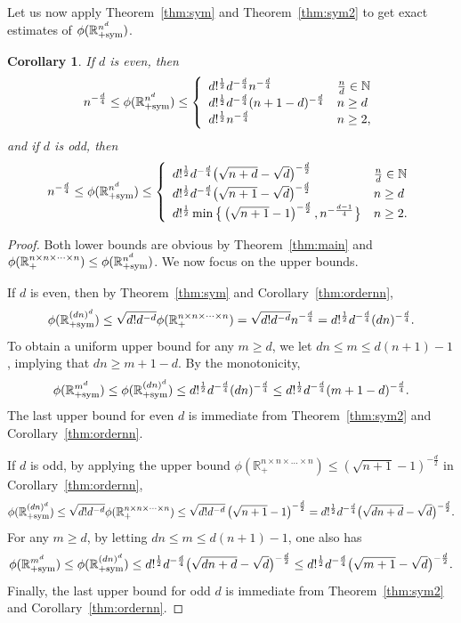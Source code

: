 \documentclass[11pt]{article}
\newtheorem{corollary}[theorem]{Corollary}
\newcommand{\R}{\mathbb{R}}
\newcommand{\N}{\mathbb{N}}
\newcommand{\sym}{\textnormal{sym}}
\begin{document}
Let us now apply Theorem~\ref{thm:sym} and Theorem~\ref{thm:sym2} to get exact estimates of $\phi(\R^{n^d}_{+\sym})$.
\begin{corollary}\label{thm:sym3}
If $d$ is even, then
  $$
  n^{-\frac{d}{4}}\le \phi(\R^{n^d}_{+\sym}) \le \left\{
  \begin{array}{ll}
  d!^{\frac{1}{2}}d^{-\frac{d}{4}}n^{-\frac{d}{4}} & \frac{n}{d}\in\N \\
  d!^{\frac{1}{2}}d^{-\frac{d}{4}}(n+1-d)^{-\frac{d}{4}} & n\ge d \\
  d!^{\frac{1}{2}}n^{-\frac{d}{4}} & n\ge2,
  \end{array}
  \right.
  $$
and if $d$ is odd, then
  $$
  n^{-\frac{d}{4}}\le \phi(\R^{n^d}_{+\sym}) \le \left\{
  \begin{array}{ll}
  d!^{\frac{1}{2}}d^{-\frac{d}{4}} \big{(}\sqrt{n+d}-\sqrt{d}\big{)}^{-\frac{d}{2}} & \frac{n}{d}\in\N \\
  d!^{\frac{1}{2}}d^{-\frac{d}{4}} \big{(}\sqrt{n+1}-\sqrt{d}\big{)}^{-\frac{d}{2}} & n\ge d \\
  d!^{\frac{1}{2}}\min\big{\{}\left(\sqrt{n+1}-1\right)^{-\frac{d}{2}},n^{-\frac{d-1}{4}}\big{\}} & n\ge2.
  \end{array}
  \right.
  $$
\end{corollary}
\begin{proof}
Both lower bounds are obvious by Theorem~\ref{thm:main} and $\phi(\R^{n\times n\times \dots \times n}_+) \le \phi(\R^{n^d}_{+\sym})$. We now focus on the upper bounds.

If $d$ is even, then by Theorem~\ref{thm:sym} and Corollary~\ref{thm:ordernn},
  $$
  \phi(\R^{(dn)^d}_{+\sym}) \le \sqrt{d!d^{-d}}\phi(\R^{n\times n\times \dots \times n}_+) = \sqrt{d!d^{-d}}n^{-\frac{d}{4}} = d!^{\frac{1}{2}}d^{-\frac{d}{4}}(dn)^{-\frac{d}{4}}.
  $$
  To obtain a uniform upper bound for any $m\ge d$, we let $dn\le m\le d(n+1)-1$, implying that $dn\ge m+1-d$. By the monotonicity,
  $$
  \phi(\R^{m^d}_{+\sym})\le \phi(\R^{(dn)^d}_{+\sym})\le d!^{\frac{1}{2}}d^{-\frac{d}{4}}(dn)^{-\frac{d}{4}} \le d!^{\frac{1}{2}}d^{-\frac{d}{4}}(m+1-d)^{-\frac{d}{4}}.
  $$
The last upper bound for even $d$ is immediate from Theorem~\ref{thm:sym2} and Corollary~\ref{thm:ordernn}.

If $d$ is odd, by applying the upper bound $\phi(\R_+^{n\times n\times \dots \times n}) \le \left(\sqrt{n+1}-1\right)^{-\frac{d}{2}}$ in Corollary~\ref{thm:ordernn},
  $$
  \phi(\R^{(dn)^d}_{+\sym}) \le \sqrt{d!d^{-d}}\phi(\R^{n\times n\times \dots \times n}_+) \le \sqrt{d!d^{-d}} \left(\sqrt{n+1}-1\right)^{-\frac{d}{2}} = d!^{\frac{1}{2}}d^{-\frac{d}{4}} \big{(}\sqrt{dn+d}-\sqrt{d}\big{)}^{-\frac{d}{2}}.
  $$
For any $m\ge d$, by letting $dn\le m\le d(n+1)-1$, one also has
  $$
  \phi(\R^{m^d}_{+\sym}) \le \phi(\R^{(dn)^d}_{+\sym}) \le d!^{\frac{1}{2}}d^{-\frac{d}{4}} \big{(}\sqrt{dn+d}-\sqrt{d}\big{)}^{-\frac{d}{2}} \le d!^{\frac{1}{2}}d^{-\frac{d}{4}} \big{(}\sqrt{m+1}-\sqrt{d}\big{)}^{-\frac{d}{2}}.
  $$
  Finally, the last upper bound for odd $d$ is immediate from Theorem~\ref{thm:sym2} and Corollary~\ref{thm:ordernn}.
\end{proof}
\end{document}
